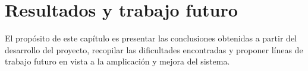 \chapter{Resultados y trabajo futuro}
El propósito de este capítulo es presentar las conclusiones obtenidas a partir
del desarrollo del proyecto, recopilar las dificultades encontradas y proponer
líneas de trabajo futuro en vista a la amplicación y mejora del sistema.

